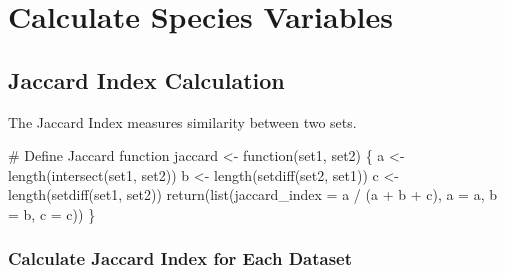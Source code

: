 \documentclass[
  letterpaper,
  DIV=11,
  numbers=noendperiod]{scrreprt}
\newenvironment{Shaded}{\begin{snugshade}}{\end{snugshade}}
\newcommand{\AttributeTok}[1]{\textcolor[rgb]{0.40,0.45,0.13}{#1}}
\newcommand{\CommentTok}[1]{\textcolor[rgb]{0.37,0.37,0.37}{#1}}
\newcommand{\ControlFlowTok}[1]{\textcolor[rgb]{0.00,0.23,0.31}{#1}}
\newcommand{\FunctionTok}[1]{\textcolor[rgb]{0.28,0.35,0.67}{#1}}
\newcommand{\NormalTok}[1]{\textcolor[rgb]{0.00,0.23,0.31}{#1}}
\newcommand{\OtherTok}[1]{\textcolor[rgb]{0.00,0.23,0.31}{#1}}
\newcommand{\SpecialCharTok}[1]{\textcolor[rgb]{0.37,0.37,0.37}{#1}}
\begin{document}

\hypertarget{calculate-species-variables}{%
\chapter{Calculate Species
Variables}\label{calculate-species-variables}}

\hypertarget{jaccard-index-calculation}{%
\section{Jaccard Index Calculation}\label{jaccard-index-calculation}}

The Jaccard Index measures similarity between two sets.

\begin{Shaded}
\begin{Highlighting}[]
\CommentTok{\# Define Jaccard function}
\NormalTok{jaccard }\OtherTok{\textless{}{-}} \ControlFlowTok{function}\NormalTok{(set1, set2) \{}
\NormalTok{  a }\OtherTok{\textless{}{-}} \FunctionTok{length}\NormalTok{(}\FunctionTok{intersect}\NormalTok{(set1, set2))}
\NormalTok{  b }\OtherTok{\textless{}{-}} \FunctionTok{length}\NormalTok{(}\FunctionTok{setdiff}\NormalTok{(set2, set1))}
\NormalTok{  c }\OtherTok{\textless{}{-}} \FunctionTok{length}\NormalTok{(}\FunctionTok{setdiff}\NormalTok{(set1, set2))}
  \FunctionTok{return}\NormalTok{(}\FunctionTok{list}\NormalTok{(}\AttributeTok{jaccard\_index =}\NormalTok{ a }\SpecialCharTok{/}\NormalTok{ (a }\SpecialCharTok{+}\NormalTok{ b }\SpecialCharTok{+}\NormalTok{ c), }\AttributeTok{a =}\NormalTok{ a, }\AttributeTok{b =}\NormalTok{ b, }\AttributeTok{c =}\NormalTok{ c))}
\NormalTok{\}}
\end{Highlighting}
\end{Shaded}

\hypertarget{calculate-jaccard-index-for-each-dataset}{%
\subsection{Calculate Jaccard Index for Each
Dataset}\label{calculate-jaccard-index-for-each-dataset}}
\end{document}

